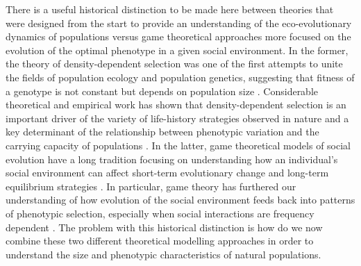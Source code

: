 \documentclass{article}
\begin{document}
There is a useful historical distinction to be made here between theories that were designed from the start to provide an understanding of the eco-evolutionary dynamics of populations versus game theoretical approaches more focused on the evolution of the optimal phenotype in a given social environment. In the former, the theory of density-dependent selection was one of the first attempts to unite the fields of population ecology and population genetics, suggesting that fitness of a genotype is not constant but depends on population size \citep{MacArthur1962, Anderson1971, Charlesworth1971}. Considerable theoretical and empirical work has shown that density-dependent selection is an important driver of the variety of life-history strategies observed in nature and a key determinant of the relationship between phenotypic variation and the carrying capacity of populations \citep{Boyce1984, Mueller1991, Charlesworth1994,Travis2013, Joshi2001, Engen2013, Wright2018, Engen2020}. In the latter, game theoretical models of social evolution have a long tradition focusing on understanding how an individual's social environment can affect short-term evolutionary change \citep{Hamilton1964a, frank1998foundations, Wolf1999SocialSelection, Queller1985a, Queller2017} and long-term equilibrium strategies \citep{MaynardSmith1982, McGill2007}. In particular, game theory has furthered our understanding of how evolution of the social environment feeds back into patterns of phenotypic selection, especially when social interactions are frequency dependent \citep{West-Eberhard1979, QUELLER1984, Araya-Ajoy2020}. The problem with this historical distinction is how do we now combine these two different theoretical modelling approaches in order to understand the size and phenotypic characteristics of natural populations. 
\end{document}
